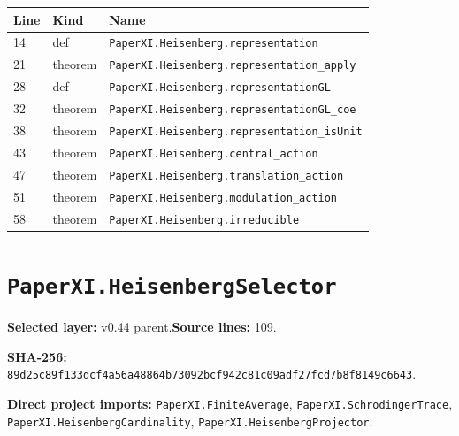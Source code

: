 \documentclass[10pt,oneside]{book}
\begin{document}
\begin{longtable}{@{}p{}p{}p{}@{}}\toprule Line&Kind&Name\\\midrule\endhead

14&def&\nolinkurl{PaperXI.Heisenberg.representation}\\

21&theorem&\nolinkurl{PaperXI.Heisenberg.representation_apply}\\

28&def&\nolinkurl{PaperXI.Heisenberg.representationGL}\\

32&theorem&\nolinkurl{PaperXI.Heisenberg.representationGL_coe}\\

38&theorem&\nolinkurl{PaperXI.Heisenberg.representation_isUnit}\\

43&theorem&\nolinkurl{PaperXI.Heisenberg.central_action}\\

47&theorem&\nolinkurl{PaperXI.Heisenberg.translation_action}\\

51&theorem&\nolinkurl{PaperXI.Heisenberg.modulation_action}\\

58&theorem&\nolinkurl{PaperXI.Heisenberg.irreducible}\\

\bottomrule\end{longtable}

\section{\texorpdfstring{\nolinkurl{PaperXI.HeisenbergSelector}}{PaperXI.HeisenbergSelector}}\label{module:PaperXI.HeisenbergSelector}

\textbf{Selected layer:} v0.44 parent.\quad\textbf{Source lines:} 109.\par\textbf{SHA-256:} {\scriptsize\nolinkurl{89d25c89f133dcf4a56a48864b73092bcf942c81c09adf27fcd7b8f8149c6643}}.


\textbf{Direct project imports:} \nolinkurl{PaperXI.FiniteAverage}, \nolinkurl{PaperXI.SchrodingerTrace}, \nolinkurl{PaperXI.HeisenbergCardinality}, \nolinkurl{PaperXI.HeisenbergProjector}.
\end{document}
